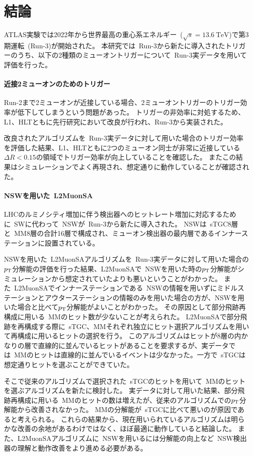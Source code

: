 \chapter{結論}\label{chapter6}
ATLAS実験では2022年から世界最高の重心系エネルギー~($\sqrt{s}=\SI{13.6}{\TeV}$)で第3期運転~(Run-3)が開始された。
本研究では~Run-3から新たに導入されたトリガーのうち、以下の2種類のミューオントリガーについて~Run-3実データを用いて評価を行った。

\subsubsection{近接2ミューオンのためのトリガー}
Run-2まで2ミューオンが近接している場合、2ミューオントリガーのトリガー効率が低下してしまうという問題があった。
トリガーの非効率に対処するため、L1、HLTともに先行研究\cite{article:taniguchi}において改良が行われ、Run-3から実装された。

改良されたアルゴリズムを~Run-3実データに対して用いた場合のトリガー効率を評価した結果、L1、HLTともに2つのミューオン同士が非常に近接している$\Delta R<0.15$の領域でトリガー効率が向上していることを確認した。
またこの結果はシミュレーションでよく再現され、想定通りに動作していることが確認された。

\subsubsection{NSWを用いた~L2MuonSA}
LHCのルミノシティ増加に伴う検出器へのヒットレート増加に対応するために~SWに代わって~NSWが~Run-3から新たに導入された。
NSWは~sTGC8層と~MM8層の合計16層で構成され、ミューオン検出器の最内層であるインナーステーションに設置されている。

NSWを用いた~L2MuonSAアルゴリズムを~Run-3実データに対して用いた場合の$p_\mathrm{T}$分解能の評価を行った結果、L2MuonSAで~NSWを用いた時の$p_\mathrm{T}$分解能がシミュレーションから想定されていたよりも悪いということがわかった。
また~L2MuonSAでインナーステーションである~NSWの情報を用いずにミドルステーションとアウターステーションの情報のみを用いた場合の方が、NSWを用いた場合と比べて$p_\mathrm{T}$分解能がよいことがわかった。
その原因として部分飛跡再構成に用いる~MMのヒット数が少ないことが考えられた。
L2MuonSAで部分飛跡を再構成する際に~sTGC、MMそれぞれ独立にヒット選択アルゴリズムを用いて再構成に用いるヒットの選択を行う。
このアルゴリズムはヒットが8層の内かなりの層で直線的に並んでいるヒットがあることを要求するが、実データでは~MMのヒットは直線的に並んでいるイベントは少なかった。一方で~sTGCは想定通りヒットを選ぶことができていた。

そこで従来のアルゴリズムで選択された~sTGCのヒットを用いて~MMのヒットを選ぶアルゴリズムを新たに検討した。
実データに対して用いた結果、部分飛跡再構成に用いる~MMのヒットの数は増えたが、従来のアルゴリズムでの$p_\mathrm{T}$分解能から改善されなかった。
MMの分解能が~sTGCに比べて悪いのが原因であると考えられる。
これらの結果から、現在用いられているアルゴリズムは明らかな改善の余地があるわけではなく、ほぼ最適に動作していると結論した。
また、L2MuonSAアルゴリズムに~NSWを用いるには分解能の向上など~NSW検出器の理解と動作改善をより進める必要がある。